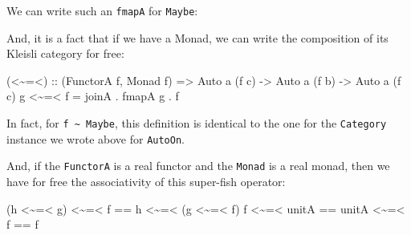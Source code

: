 \documentclass[]{article}
\newenvironment{Shaded}{}{}
\newcommand{\DataTypeTok}[1]{\textcolor[rgb]{0.56,0.13,0.00}{#1}}
\newcommand{\KeywordTok}[1]{\textcolor[rgb]{0.00,0.44,0.13}{\textbf{#1}}}
\newcommand{\NormalTok}[1]{#1}
\newcommand{\OperatorTok}[1]{\textcolor[rgb]{0.40,0.40,0.40}{#1}}
\newcommand{\OtherTok}[1]{\textcolor[rgb]{0.00,0.44,0.13}{#1}}
\begin{document}
We can write such an \texttt{fmapA} for \texttt{Maybe}:

\begin{Shaded}
\end{Shaded}

And, it is a fact that if we have a Monad, we can write the composition of its
Kleisli category for free:

\begin{Shaded}
\begin{Highlighting}[]
\OtherTok{(\textless{}\textasciitilde{}=\textless{}) ::}\NormalTok{ (}\DataTypeTok{FunctorA}\NormalTok{ f, }\DataTypeTok{Monad}\NormalTok{ f) }\OtherTok{=\textgreater{}} \DataTypeTok{Auto}\NormalTok{ a (f c) }\OtherTok{{-}\textgreater{}} \DataTypeTok{Auto}\NormalTok{ a (f b) }\OtherTok{{-}\textgreater{}} \DataTypeTok{Auto}\NormalTok{ a (f c)}
\NormalTok{g }\OperatorTok{\textless{}\textasciitilde{}=\textless{}}\NormalTok{ f }\OtherTok{=}\NormalTok{ joinA }\OperatorTok{.}\NormalTok{ fmapA g }\OperatorTok{.}\NormalTok{ f}
\end{Highlighting}
\end{Shaded}

In fact, for \texttt{f\ \textasciitilde{}\ Maybe}, this definition is identical
to the one for the \texttt{Category} instance we wrote above for
\texttt{AutoOn}.

And, if the \texttt{FunctorA} is a real functor and the \texttt{Monad} is a real
monad, then we have for free the associativity of this super-fish operator:

\begin{Shaded}
\begin{Highlighting}[]
\NormalTok{(h }\OperatorTok{\textless{}\textasciitilde{}=\textless{}}\NormalTok{ g) }\OperatorTok{\textless{}\textasciitilde{}=\textless{}}\NormalTok{ f }\OperatorTok{==}\NormalTok{ h }\OperatorTok{\textless{}\textasciitilde{}=\textless{}}\NormalTok{ (g }\OperatorTok{\textless{}\textasciitilde{}=\textless{}}\NormalTok{ f)}
\NormalTok{f }\OperatorTok{\textless{}\textasciitilde{}=\textless{}}\NormalTok{ unitA      }\OperatorTok{==}\NormalTok{ unitA }\OperatorTok{\textless{}\textasciitilde{}=\textless{}}\NormalTok{ f      }\OperatorTok{==}\NormalTok{ f}
\end{Highlighting}
\end{Shaded}
\end{document}
